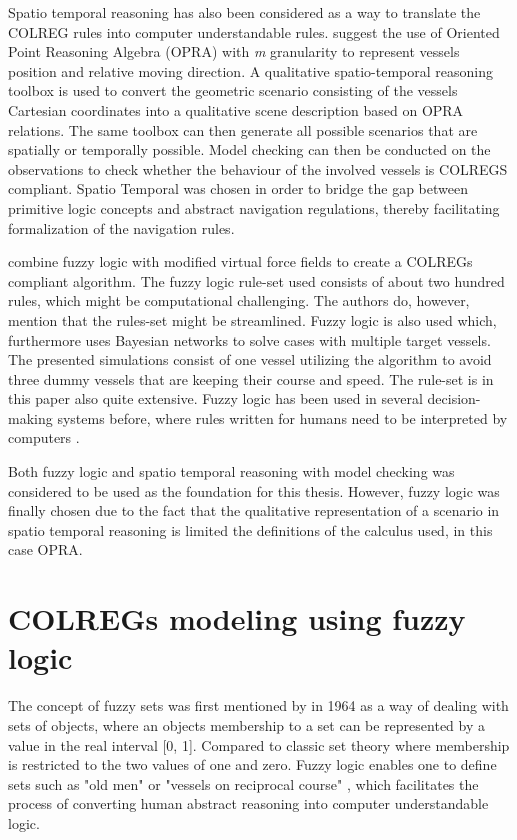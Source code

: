 Spatio temporal reasoning has also been considered as a way to translate the COLREG rules into computer understandable rules. \textcite{spat_temp1,spat_temp2}
suggest the use of Oriented Point Reasoning Algebra (OPRA) with \textit{m}  granularity to represent vessels position and relative moving direction.
A qualitative spatio-temporal reasoning toolbox is used to convert the geometric scenario consisting of the vessels Cartesian coordinates into a qualitative scene description based on OPRA relations. The same toolbox can then generate all possible scenarios that are spatially or temporally possible. Model checking can then be conducted on the  observations to check whether the behaviour of the involved vessels is  COLREGS compliant. Spatio Temporal was chosen in order to bridge the gap between primitive logic concepts and abstract navigation regulations, thereby facilitating formalization of the navigation rules.


\textcite{lee2004fuzzy} combine fuzzy logic with modified virtual force fields to  create a COLREGs compliant algorithm. The fuzzy logic rule-set used consists of about two hundred rules, which might be computational challenging. The authors do, however, mention that the rules-set might be streamlined. Fuzzy logic is also used \textcite{perera2012intelligent} which, furthermore uses Bayesian networks to solve cases with multiple target vessels. The presented simulations consist of one vessel utilizing the algorithm to avoid three dummy vessels that are keeping their course and speed. The rule-set is in this paper also quite extensive. Fuzzy logic has been used in several decision-making systems before, where rules written for humans need to be interpreted by computers \cite{perera2012intelligent}.


Both fuzzy logic and spatio temporal reasoning with model checking was considered to be used as the foundation for this thesis. However, fuzzy logic was finally chosen due to the fact that the qualitative representation of a scenario in spatio temporal reasoning is limited the definitions of the calculus used, in this case OPRA.
\chapter{COLREGs modeling using fuzzy logic}
\label{chap:fuzzy}
The concept of fuzzy sets was first mentioned by \textcite{zadeh1996fuzzy} in 1964 as a way of dealing with sets of objects, where an objects membership to a set can be represented by a value in the real interval [0, 1]. Compared to classic set theory where  membership is restricted to the two values of one and zero. Fuzzy logic enables one to define sets such as "old men" or "vessels on reciprocal course" \cite{zadeh1996fuzzy}, which facilitates the process of converting human abstract reasoning into computer understandable logic.
